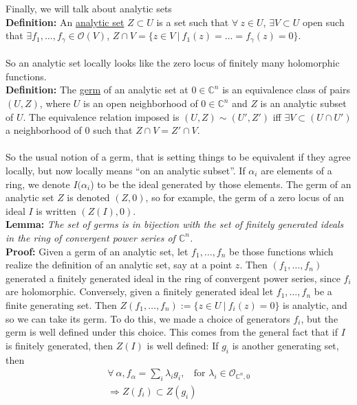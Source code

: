 \documentclass[12pt]{report}
\theoremstyle{definition}
\theoremstyle{remark}
\numberwithin{equation}{section}
\theoremstyle{definition}
\newcommand{\bb}[1]{\mathbb{#1}}
\begin{document}
Finally, we will talk about analytic sets\\
\textbf{Definition: }An \underline{analytic set} $Z \subset U$ is a set such that $\forall\ z \in U$, $\exists V \subset U$ open such that $\exists f_1,\dots,f_\gamma \in \mathcal{O}(V)$, $Z \cap V = \{z \in V\ |\ f_1(z) = \dots = f_\gamma(z) = 0\}$.\\\\
So an analytic set locally looks like the zero locus of finitely many holomorphic functions.\\
\textbf{Definition: }The \underline{germ} of an analytic set at $0 \in \bb C^n$ is an equivalence class of pairs $(U,Z)$, where $U$ is an open neighborhood of $0 \in \bb C^n$ and $Z$ is an analytic subset of $U$. The equivalence relation imposed is $(U,Z) \sim (U',Z')$ iff $\exists V \subset (U \cap U')$ a neighborhood of 0 such that $Z \cap V = Z' \cap V$.\\\\
So the usual notion of a germ, that is setting things to be equivalent if they agree locally, but now locally means ``on an analytic subset''. If $\alpha_i$ are elements of a ring, we denote $I(\alpha_i$) to be the ideal generated by those elements. The germ of an analytic set $Z$ is denoted $(Z,0)$, so for example, the germ of a zero locus of an ideal $I$ is written $(Z(I),0)$. \\
\textbf{Lemma: }\textit{The set of germs is in bijection with the set of finitely generated ideals in the ring of convergent power series of $\bb C^n$.}\\
\textbf{Proof: }Given a germ of an analytic set, let $f_1,\dots,f_n$ be those functions which realize the definition of an analytic set, say at a point $z$. Then $(f_1,\dots,f_n)$ generated a finitely generated ideal in the ring of convergent power series, since $f_i$ are holomorphic. Conversely, given a finitely generated ideal let $f_1,\dots,f_n$ be a finite generating set. Then $Z(f_1,\dots,f_n) := \{z \in U\ |\ f_i(z) = 0\}$ is analytic, and so we can take its germ. To do this, we made a choice of generators $f_i$, but the germ is well defined under this choice. This comes from the general fact that if $I$ is finitely generated, then $Z(I)$ is well defined: If $g_i$ is another generating set, then 
\begin{gather*}
	\forall\ \alpha, f_\alpha = \sum_i \lambda_i g_i,\ \  \ \ \text{for  } \lambda_i \in \mathcal{O}_{\bb C^n,0}\\
\Rightarrow Z(f_i) \subset Z(g_i)
\end{gather*}
\end{document}
